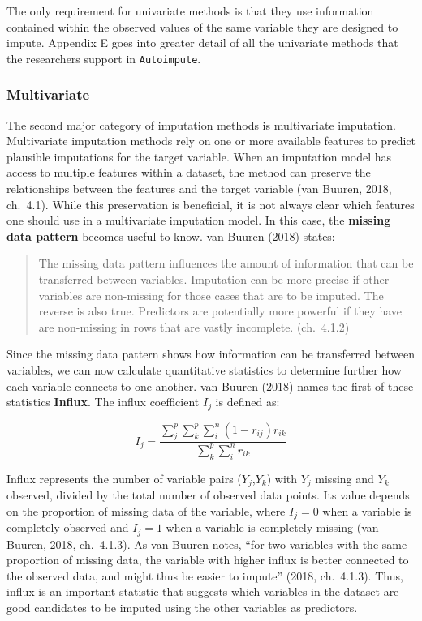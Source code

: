 \documentclass[12pt,oneside]{chicagocapstone}
\begin{document}
The only requirement for univariate methods is that they use information
contained within the observed values of the same variable they are
designed to impute. Appendix E goes into greater detail of all the
univariate methods that the researchers support in \texttt{Autoimpute}.

\subsubsection*{Multivariate}\label{multivariate}

The second major category of imputation methods is multivariate
imputation. Multivariate imputation methods rely on one or more
available features to predict plausible imputations for the target
variable. When an imputation model has access to multiple features
within a dataset, the method can preserve the relationships between the
features and the target variable (van Buuren, 2018, ch.~4.1). While this
preservation is beneficial, it is not always clear which features one
should use in a multivariate imputation model. In this case, the
\textbf{missing data pattern} becomes useful to know. van Buuren (2018)
states:
\begin{quote}
The missing data pattern influences the amount of information that can
be transferred between variables. Imputation can be more precise if
other variables are non-missing for those cases that are to be imputed.
The reverse is also true. Predictors are potentially more powerful if
they have are non-missing in rows that are vastly incomplete.
(ch.~4.1.2)
\end{quote}
Since the missing data pattern shows how information can be transferred
between variables, we can now calculate quantitative statistics to
determine further how each variable connects to one another. van Buuren
(2018) names the first of these statistics \textbf{Influx}. The influx
coefficient \(I_j\) is defined as:

\[I_j = \frac{\sum_j^p\sum_k^p\sum_i^n (1-r_{ij})r_{ik}}{\sum_k^p\sum_i^n r_{ik}}\]

Influx represents the number of variable pairs (\(Y_j\),\(Y_k\)) with
\(Y_j\) missing and \(Y_k\) observed, divided by the total number of
observed data points. Its value depends on the proportion of missing
data of the variable, where \(I_j=0\) when a variable is completely
observed and \(I_j=1\) when a variable is completely missing (van
Buuren, 2018, ch.~4.1.3). As van Buuren notes, ``for two variables with
the same proportion of missing data, the variable with higher influx is
better connected to the observed data, and might thus be easier to
impute'' (2018, ch.~4.1.3). Thus, influx is an important statistic that
suggests which variables in the dataset are good candidates to be
imputed using the other variables as predictors.
\end{document}
